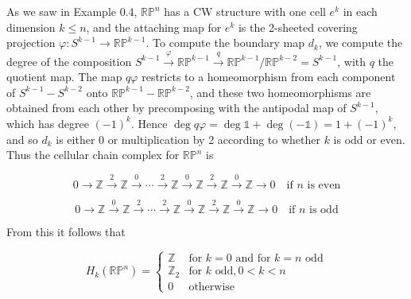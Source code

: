 \begin{example}
\label{ex:cellular-homology-rpn}
As we saw in Example 0.4, $\mathbb{RP}^n$ has a CW structure with one cell $e^k$ in each dimension $k \le n$, and the attaching map for $e^k$ is the 2-sheeted covering projection $\varphi: S^{k-1} \to \mathbb{RP}^{k-1}$. To compute the boundary map $d_k$, we compute the degree of the composition $S^{k-1} \xrightarrow{\varphi} \mathbb{RP}^{k-1} \xrightarrow{q} \mathbb{RP}^{k-1}/\mathbb{RP}^{k-2} = S^{k-1}$, with $q$ the quotient map. The map $q\varphi$ restricts to a homeomorphism from each component of $S^{k-1} - S^{k-2}$ onto $\mathbb{RP}^{k-1} - \mathbb{RP}^{k-2}$, and these two homeomorphisms are obtained from each other by precomposing with the antipodal map of $S^{k-1}$, which has degree $(-1)^k$. Hence $\deg q\varphi = \deg \mathbb{1} + \deg(-\mathbb{1}) = 1 + (-1)^k$, and so $d_k$ is either 0 or multiplication by 2 according to whether $k$ is odd or even. Thus the cellular chain complex for $\mathbb{RP}^n$ is
\end{example}

\[
0 \to \mathbb{Z} \xrightarrow{2} \mathbb{Z} \xrightarrow{0} \cdots \xrightarrow{2} \mathbb{Z} \xrightarrow{0} \mathbb{Z} \xrightarrow{2} \mathbb{Z} \xrightarrow{0} \mathbb{Z} \to 0 \quad \text{if } n \text{ is even}
\]

\[
0 \to \mathbb{Z} \xrightarrow{0} \mathbb{Z} \xrightarrow{2} \cdots \xrightarrow{2} \mathbb{Z} \xrightarrow{0} \mathbb{Z} \xrightarrow{2} \mathbb{Z} \xrightarrow{0} \mathbb{Z} \to 0 \quad \text{if } n \text{ is odd}
\]

From this it follows that

\[
H_k(\mathbb{RP}^n) = \begin{cases}
\mathbb{Z} & \text{for } k = 0 \text{ and for } k = n \text{ odd} \\
\mathbb{Z}_2 & \text{for } k \text{ odd}, 0 < k < n \\
0 & \text{otherwise}
\end{cases}
\]


